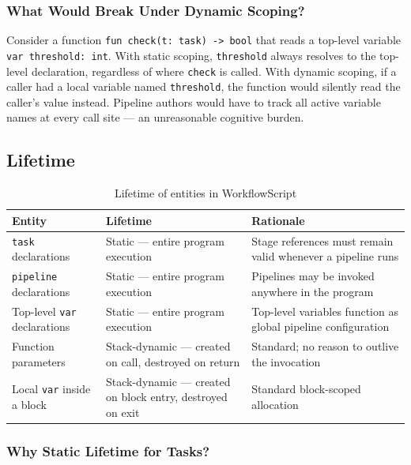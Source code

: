 \documentclass[10pt,a4paper]{article}
\begin{document}
\subsubsection{What Would Break Under Dynamic Scoping?}

Consider a function \texttt{fun check(t: task) -> bool} that reads a
top-level variable \texttt{var threshold: int}. With static scoping,
\texttt{threshold} always resolves to the top-level declaration,
regardless of where \texttt{check} is called. With dynamic scoping, if
a caller had a local variable named \texttt{threshold}, the function
would silently read the caller's value instead. Pipeline authors would
have to track all active variable names at every call site --- an
unreasonable cognitive burden.

\subsection{Lifetime}

\begin{table}[h!]
\centering
\begin{tabular}{@{}p{4cm}p{4.5cm}p{5.5cm}@{}}
\toprule
\textbf{Entity} & \textbf{Lifetime} & \textbf{Rationale} \\
\midrule
\texttt{task} declarations
    & Static --- entire program execution
    & Stage references must remain valid whenever a pipeline runs \\
\texttt{pipeline} declarations
    & Static --- entire program execution
    & Pipelines may be invoked anywhere in the program \\
Top-level \texttt{var} declarations
    & Static --- entire program execution
    & Top-level variables function as global pipeline configuration \\
Function parameters
    & Stack-dynamic --- created on call, destroyed on return
    & Standard; no reason to outlive the invocation \\
Local \texttt{var} inside a block
    & Stack-dynamic --- created on block entry, destroyed on exit
    & Standard block-scoped allocation \\
\bottomrule
\end{tabular}
\caption{Lifetime of entities in WorkflowScript}
\end{table}

\subsubsection{Why Static Lifetime for Tasks?}
\end{document}
